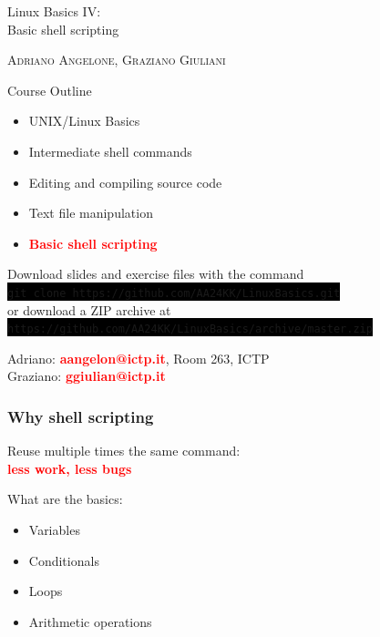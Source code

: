 \documentclass[unknownkeysallowed, 10pt, a4 paper, handout]{beamer}
\newcommand{\focus}[1]{\textbf{\textcolor{red}{#1}}}
\newcommand{\code}[1]{\colorbox{black}{\color{green}\texttt{#1}}}
\begin{document}
\begin{frame}
  \begin{center}


    \begin{block}{}
      \Large
      \centering
      Linux Basics IV:\\
      Basic shell scripting
    \end{block}

    \vspace{6mm}
    \large
    \textsc{Adriano Angelone, Graziano Giuliani} \\

  \end{center}
\end{frame}

\begin{frame}[label=outline]{Course Outline}
  \begin{itemize}
    \item UNIX/Linux Basics
    \item Intermediate shell commands
    \item Editing and compiling source code
    \item Text file manipulation
    \item \focus{Basic shell scripting}
  \end{itemize}

  \vspace{6mm}

  \centering
  Download slides and exercise files with the command\\
  \code{git clone https://github.com/AA24KK/LinuxBasics.git}\\
  \vspace{1mm}
  or download a ZIP archive at
  \vspace{1mm}
  \code{https://github.com/AA24KK/LinuxBasics/archive/master.zip}

  \vspace{2mm}

  Adriano: \focus{aangelon@ictp.it}, Room 263, ICTP\\
  Graziano: \focus{ggiulian@ictp.it}

\end{frame}

\begin{frame}
  \begin{center}
    \frametitle{Why shell scripting}

    Reuse multiple times the same command:\\
    \focus{less work, less bugs}

    What are the basics:
    \begin{itemize}
      \item Variables
      \item Conditionals
      \item Loops
      \item Arithmetic operations
    \end{itemize}
  \end{center}
\end{frame}
\end{document}
